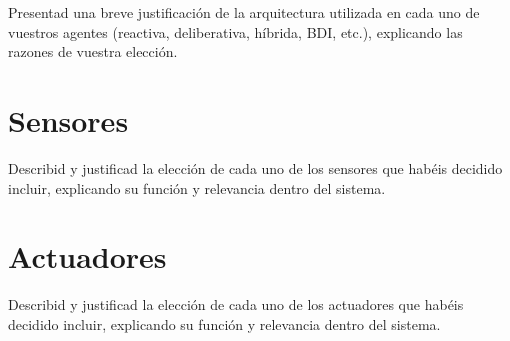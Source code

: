 \documentclass[a4paper,12pt]{article}
\begin{document}
Presentad una breve justificación de la arquitectura utilizada en cada uno de vuestros agentes (reactiva, deliberativa, híbrida, BDI, etc.), explicando las razones de vuestra elección.
\section*{\large Sensores}

Describid y justificad la elección de cada uno de los sensores que habéis decidido incluir, explicando su función y relevancia dentro del sistema.
\section*{\large Actuadores}
Describid y justificad la elección de cada uno de los actuadores que habéis decidido incluir, explicando su función y relevancia dentro del sistema.
\end{document}

